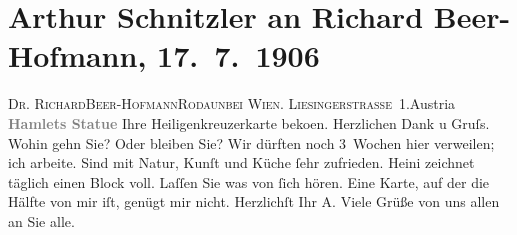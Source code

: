 

         
         \newcommand{\erwaehntePersonen}{Personen: Richard Beer-Hofmann, Heinrich Schnitzler}
         \newcommand{\erwaehnteInstitutionen}{}
         \newcommand{\erwaehnteOrte}{Orte: Heiligenkreuz, Helsingør, Liesingerstraße, Rodaun, Wien, Österreich}
         \newcommand{\erwaehnteWerke}{Werke: Hamlet}
               \section[Arthur Schnitzler an Richard Beer-Hofmann, 17. 7. 1906]{ Arthur Schnitzler an Richard Beer-Hofmann, 17. 7. 1906}\nopagebreak{}\rehead{ }\begin{ledgroupsized}[t]{13cm}\normalsize\beginnumbering \toendnotes[C]{\smallbreak\pagebreak[2]} 
\pstart{}{\pb}\textsc{Dr. Richard}\pend{}\pstart{}\textsc{Beer-Hofmann}\pend{}\pstart{}\textsc{Rodaun}\pend{}\pstart{}\textsc{bei Wien}. \pend{}\pstart{}\textsc{Liesingerstraße 1}.\pend{}\pstart{}Austria\pend{}{\bigskip}\pstart
           \noindent{}{\pb}\textcolor{gray}{\textbf{Hamlets Statue}}\pend
           \pstart
           {\pb}Ihre Heiligenkreuzerkarte beko{\geminationm}en. Herzlichen Dank u
               Gruſs. Wohin gehn Sie? Oder bleiben Sie? Wir dürften noch 3 Wochen hier verweilen;
               ich arbeite. Sind mit Natur, Kunſt und Küche ſehr zufrieden. Heini zeichnet täglich einen Block voll. Laſſen Sie was von
               ſich hören. Eine Karte, auf der die Hälfte von mir iſt, genügt mir nicht. Herzlichſt
               Ihr \spacefill\mbox{A.}\pend
           \pstart
           \noindent{}{\pb}Viele Grüße von uns allen an Sie alle.\pend
           
         
         \endnumbering{}\end{ledgroupsized}  \newcommand{\dateiname}{L01613}\newcommand{\titel}{Arthur Schnitzler an Richard Beer-Hofmann, 17. 7. 1906}\newcommand{\editorInnen}{Martin Anton Müller und Gerd-Hermann Susen}
      
